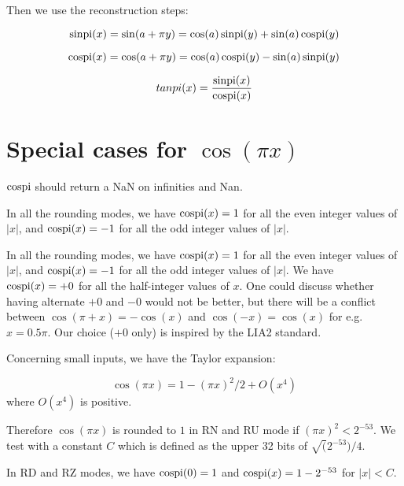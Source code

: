 Then we use the reconstruction steps:

\begin{equation}        
  \operatorname{sinpi}(x) = \sin(a + \pi y) =  \cos(a) \operatorname{sinpi}(y) +  \sin(a) \operatorname{cospi}(y) 
  \label{eq:sinpiapy}
\end{equation}

\begin{equation}
  \operatorname{cospi}(x) = \cos(a + \pi y) = \cos(a) \operatorname{cospi}(y) -  \sin(a) \operatorname{sinpi}(y) 
  \label{eq:cospiapy}
\end{equation}

\begin{equation} 
  tanpi(x) = \frac{\operatorname{sinpi}(x)}{\operatorname{cospi}(x)} 
  \label{eq:tanpiapy}
\end{equation}



\section{Special cases for $\cos(\pi x)$ }

$\operatorname{cospi}$ should return a NaN on infinities and Nan.

In all the rounding modes, we have $\operatorname{cospi}(x)=1$ for all the even integer
 values of $|x|$, and $\operatorname{cospi}(x)=-1$ for all the odd integer values of
 $|x|$.


 In all the rounding modes, we have $\operatorname{cospi}(x)=1$ for all the even
 integer values of $|x|$, and $\operatorname{cospi}(x)=-1$ for all the odd integer
 values of $|x|$. We have $\operatorname{cospi}(x)=+0$ for all the half-integer
 values of $x$. One could discuss whether having alternate $+0$ and
 $-0$ would not be better, but there will be a conflict between
 $\cos(\pi+x)=-\cos(x)$ and $\cos(-x)=\cos(x)$ for e.g. $x=0.5\pi$.
 Our choice ($+0$ only) is inspired by the LIA2 standard.


 Concerning small inputs, we have the Taylor expansion:

  \begin{equation}
    \cos(\pi x) = 1-(\pi x)^2/2 + O(x^4)\label{eq:cospiTaylor}
  \end{equation}
 where $O(x^4)$ is positive.

 Therefore $\cos(\pi x)$ is rounded to $1$ in RN and RU mode if $(\pi
 x)^2<{2^{-53}}$. We test with a constant $C$ which is defined as the
 upper 32 bits of  $\sqrt(2^{-53})/4$.

 In RD and RZ modes, we have $\operatorname{cospi}(0)=1$ and $\operatorname{cospi}(x)=1-2^{-53}$
 for $|x|<C$. 






